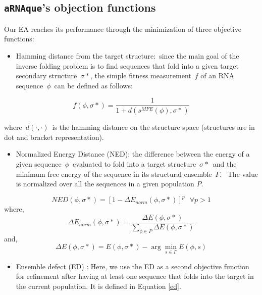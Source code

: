 \subsection{\texttt{aRNAque}'s objection functions}
Our EA reaches its performance through the minimization of three objective functions:

\begin{itemize}
	\item
	Hamming distance from the target structure:~since the main goal of the inverse folding problem is to find sequences that fold into a given target secondary structure~\(\sigma*\), the simple fitness measurement~\(f\) of an RNA sequence~\(\phi\)~can be defined as follows:
\end{itemize}

\begin{equation}
\label{fitness}
f(\phi, \sigma*) = \frac{1}{1 + d(s^{MFE}(\phi) , \sigma*)}
\end{equation}

where~\(d(\cdot,\cdot)\)~is the hamming distance on the structure space (structures are in dot and bracket representation).

\begin{itemize}
	\item
	Normalized Energy Distance (NED): the difference between
	the energy of a given sequence~\(\phi\)~evaluated to fold
	into a target structure~\(\sigma*\)~and the minimum free energy
	of the sequence in its structural ensemble~\(\Gamma\).~ The value is normalized over all the sequences in a given population $P$.  
\end{itemize}

\begin{equation}
\label{ned}
NED(\phi, \sigma*) = [1-\Delta E_{norm}(\phi, \sigma*)]^p \text{   } \forall p>1
\end{equation}
where,
\begin{equation}
\Delta E_{norm}(\phi, \sigma*) = \frac{\Delta E(\phi, \sigma*) }{\sum_{\phi \in P}{\Delta E(\phi, \sigma*)}}
\end{equation}
and,
\begin{equation}
\Delta E(\phi, \sigma*) = E(\phi, \sigma*) - \arg \min_{s \in \Gamma} E(\phi, s)
\end{equation}

\begin{itemize}
	\item
	Ensemble defect (ED) \cite{zadeh2011nucleic}: Here, we use the ED as a second objective function for refinement after having at least one sequence that folds into the target in the current population. It is defined in Equation \ref{ed}.
\end{itemize}


